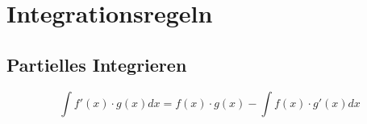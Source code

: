\section{Integrationsregeln}
\subsection{Partielles Integrieren}
\[ \boxed{\int f'(x) \cdot g(x) dx = f(x) \cdot g(x) - \int f(x) \cdot g'(x) dx} \]
